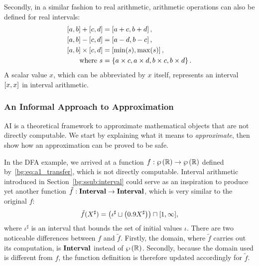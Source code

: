 Secondly, in a similar fashion to real arithmetic, arithmetic operations can
also be defined for real intervals:
\begin{equation}
    \begin{aligned}
        \left[{a}, {b}\right] + \left[{c}, {d}\right] &= \left[{a + c}, {b + d}\right], \\
        \left[{a}, {b}\right] - \left[{c}, {d}\right] &= \left[{a - d}, {b - c}\right], \\
        \left[{a}, {b}\right] \times \left[{c}, {d}\right]
            &= \left[{\min(s)}, {\max(s)}\right], \\
        \text{where~} s &= \left\{
            a \times c, a \times d, b \times c, b \times d
        \right\}.
    \end{aligned}
    \label{bg:eq:interval_operations}
\end{equation}
A scalar value $x$, which can be abbreviated by $x$ itself, represents an
interval $\left[{x}, {x}\right]$ in interval arithmetic.

\subsubsection{An Informal Approach to Approximation}
\label{bg:ssub:informal}

AI is a theoretical framework to approximate mathematical objects that
are not directly computable.  We start by explaining what it means to
\emph{approximate}, then show how an approximation can be proved to be safe.

In the DFA example, we arrived at a function $f: \wp\left({\mathbb{R}}\right)
\to \wp\left({\mathbb{R}}\right)$ defined by~\eqref{bg:eq:a1_transfer}, which
is not directly computable.  Interval arithmetic introduced in
Section~\ref{bg:ssub:interval} could serve as an inspiration to produce yet
another function $\tilde{f}: \mathbf{Interval} \to \mathbf{Interval}$, which is very
similar to the original $f$:
\begin{equation}
    \tilde{f}(X^\sharp) = \left(
        \iota^\sharp \sqcup \left( 0.9 X^\sharp \right)
    \right) \sqcap [1, \infty],
    \label{bg:eq:a1_transfer_interval}
\end{equation}
where $\iota^\sharp$ is an interval that bounds the set of initial values
$\iota$.  There are two noticeable differences between $f$ and $\tilde{f}$.
Firstly, the domain, where $\tilde{f}$ carries out its computation, is
$\mathbf{Interval}$ instead of $\wp\left({\mathbb{R}}\right)$.  Secondly, because the domain
used is different from $f$, the function definition is therefore updated
accordingly for $\tilde{f}$.


